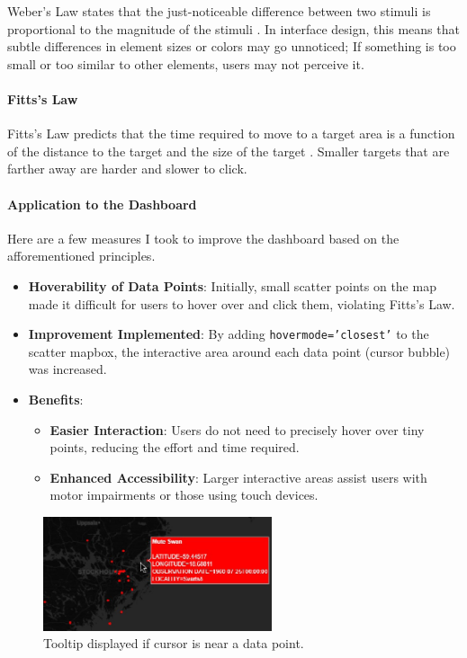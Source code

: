 Weber's Law states that the just-noticeable difference between two stimuli is proportional to the magnitude of the stimuli \cite{mccrocklinInteractionDesignData2015}. In interface design, this means that subtle differences in element sizes or colors may go unnoticed; If something is too small or too similar to other elements, users may not perceive it.

\paragraph{Fitts's Law}

Fitts's Law predicts that the time required to move to a target area is a function of the distance to the target and the size of the target \cite{mccrocklinInteractionDesignData2015}. Smaller targets that are farther away are harder and slower to click.

\paragraph{Application to the Dashboard}
Here are a few measures I took to improve the dashboard based on the afforementioned principles.

\begin{itemize}
    \item \textbf{Hoverability of Data Points}: Initially, small scatter points on the map made it difficult for users to hover over and click them, violating Fitts's Law. 
    \item \textbf{Improvement Implemented}: By adding \texttt{hovermode='closest'} to the scatter mapbox, the interactive area around each data point (cursor bubble) was increased. 
    \item \textbf{Benefits}: 
    \begin{itemize} 
        \item \textbf{Easier Interaction}: Users do not need to precisely hover over tiny points, reducing the effort and time required. 
        \item \textbf{Enhanced Accessibility}: Larger interactive areas assist users with motor impairments or those using touch devices. 
    \end{itemize} 
\end{itemize}

\begin{figure}[H] 
    \centering 
    \includegraphics[width=0.6\textwidth]{figures/cursor_bubbles.jpg} 
    \caption{Tooltip displayed if cursor is near a data point.} 
    \label{fig:cursor_bubbles} 
\end{figure}

